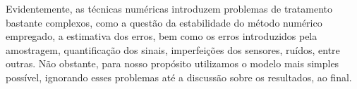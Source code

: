 Evidentemente, as técnicas numéricas introduzem problemas de tratamento bastante complexos, como a questão da estabilidade do método numérico empregado, a estimativa dos erros, bem como os erros introduzidos pela amostragem, quantificação dos sinais, imperfeições dos sensores, ruídos, entre outras. Não obstante, para nosso propósito utilizamos o modelo mais simples possível, ignorando esses problemas até a discussão sobre os resultados, ao final.
